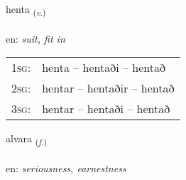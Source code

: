 \documentclass[frontgrid, backgrid]{flacards}\usepackage[]{graphicx}\usepackage[]{color}
\begin{document}
\renewcommand{\flhead}{\vskip5pt \fboxsep=0pt {\small\bfseries\footnotesize Sagnorð | Verb}}
\renewcommand{\fcfoot}{\vskip5pt \fboxsep=0pt \hspace{2pt}{\small\bfseries\footnotesize 2K}}

\renewcommand{\blhead}{\vskip5pt {\small\bfseries\footnotesize Sagnorð | Verb }}
\renewcommand{\bcfoot}{\vskip5pt \hspace{2pt}{\small\bfseries\footnotesize 2K}}


{henta \small{\textsubscript{(\textit{v.})}} \\[1ex] %
\textphonetic{[hɛn̥ta]} \\
en: \emph{suit, fit in} \\  [2ex]
\renewcommand*{\arraystretch}{0.8}
\begin{tabular}{p{1cm}l}
\textsc{1sg}: & henta -- hentaði -- hentað \\ 
\textsc{2sg}: & hentar -- hentaðir -- hentað \\ 
\textsc{3sg}: & hentar -- hentaði -- hentað \\ 
\end{tabular}
}

\renewcommand{\flhead}{\vskip5pt \fboxsep=0pt {\small\bfseries\footnotesize Nafnorð | Noun}}
\renewcommand{\fcfoot}{\vskip5pt \fboxsep=0pt \hspace{2pt}{\small\bfseries\footnotesize 2K}}

\renewcommand{\blhead}{\vskip5pt {\small\bfseries\footnotesize Nafnorð | Noun }}
\renewcommand{\bcfoot}{\vskip5pt \hspace{2pt}{\small\bfseries\footnotesize 2K}}


{alvara \small{\textsubscript{(\textit{f.})}} \\[1ex] %
\textphonetic{[alvara]} \\
en: \emph{seriousness, earnestness} \\  [2ex]
\renewcommand*{\arraystretch}{0.8}
}
\end{document}
